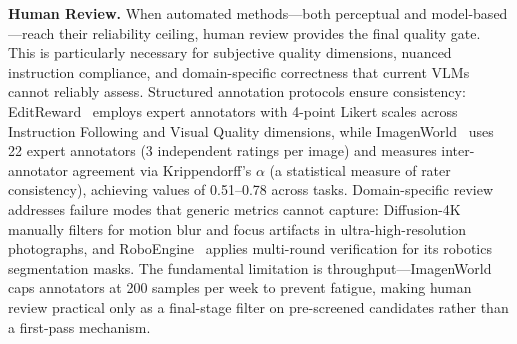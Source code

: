 \documentclass{llmxive}
\begin{document}
\textbf{Human Review.}
When automated methods---both perceptual and model-based---reach their reliability ceiling, human review provides the final quality gate. This is particularly necessary for subjective quality dimensions, nuanced instruction compliance, and domain-specific correctness that current VLMs cannot reliably assess. Structured annotation protocols ensure consistency: EditReward~\citep{wu2025editreward} employs expert annotators with 4-point Likert scales across Instruction Following and Visual Quality dimensions, while ImagenWorld~\citep{sani2026imagenworld} uses 22 expert annotators (3 independent ratings per image) and measures inter-annotator agreement via Krippendorff's $\alpha$ (a statistical measure of rater consistency), achieving values of 0.51--0.78 across tasks. Domain-specific review addresses failure modes that generic metrics cannot capture: Diffusion-4K~\citep{zhang2025diffusion} manually filters for motion blur and focus artifacts in ultra-high-resolution photographs, and RoboEngine~\citep{yuan2025roboengine} applies multi-round verification for its robotics segmentation masks. The fundamental limitation is throughput---ImagenWorld caps annotators at 200 samples per week to prevent fatigue, making human review practical only as a final-stage filter on pre-screened candidates rather than a first-pass mechanism.
\end{document}
